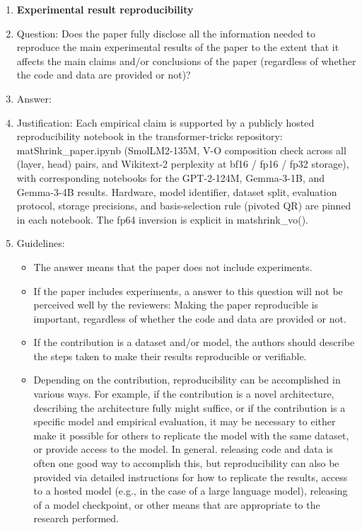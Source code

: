 \begin{enumerate}
    \item {\bf Experimental result reproducibility}
    \item[] Question: Does the paper fully disclose all the information needed to reproduce the main experimental results of the paper to the extent that it affects the main claims and/or conclusions of the paper (regardless of whether the code and data are provided or not)?
    \item[] Answer: \answerYes{} %
    \item[] Justification:  Each empirical claim is supported by a publicly hosted reproducibility notebook in the transformer-tricks repository: matShrink\_paper.ipynb (SmolLM2-135M, V-O composition check across all (layer, head) pairs, and Wikitext-2 perplexity at bf16 / fp16 / fp32 storage), with corresponding notebooks for the GPT-2-124M, Gemma-3-1B, and Gemma-3-4B results. Hardware, model identifier, dataset split, evaluation protocol, storage precisions, and basis-selection rule (pivoted QR) are pinned in each notebook. The fp64 inversion is explicit in matshrink\_vo().
    \item[] Guidelines:
    \begin{itemize}
        \item The answer \answerNA{} means that the paper does not include experiments.
        \item If the paper includes experiments, a \answerNo{} answer to this question will not be perceived well by the reviewers: Making the paper reproducible is important, regardless of whether the code and data are provided or not.
        \item If the contribution is a dataset and\slash or model, the authors should describe the steps taken to make their results reproducible or verifiable.
        \item Depending on the contribution, reproducibility can be accomplished in various ways. For example, if the contribution is a novel architecture, describing the architecture fully might suffice, or if the contribution is a specific model and empirical evaluation, it may be necessary to either make it possible for others to replicate the model with the same dataset, or provide access to the model. In general. releasing code and data is often one good way to accomplish this, but reproducibility can also be provided via detailed instructions for how to replicate the results, access to a hosted model (e.g., in the case of a large language model), releasing of a model checkpoint, or other means that are appropriate to the research performed.

\end{itemize}
\end{enumerate}

